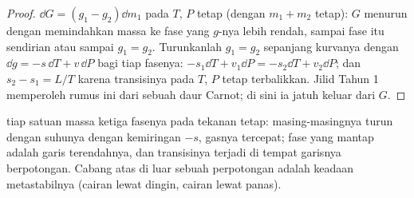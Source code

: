 \begin{proof}
$\dd G = (g_1 - g_2)\dd m_1$ pada $T$, $P$ tetap (dengan $m_1 + m_2$ tetap):
$G$ menurun dengan memindahkan massa ke fase yang $g$-nya lebih rendah, sampai fase
itu sendirian atau sampai $g_1 = g_2$. Turunkanlah $g_1 = g_2$ sepanjang
kurvanya dengan $\dd g = -s\,\dd T + v\,\dd P$ bagi tiap fasenya: $-s_1\dd T +
v_1\dd P = -s_2\dd T + v_2\dd P$; dan $s_2 - s_1 = L/T$ karena transisinya
pada $T$, $P$ tetap terbalikkan. Jilid Tahun 1 memperoleh rumus ini
dari sebuah daur Carnot; di sini ia jatuh keluar dari $G$.
\end{proof}

\begin{omfigure}

{\small {} tiap satuan massa ketiga fasenya pada tekanan
tetap: masing-masingnya turun dengan suhunya dengan kemiringan $-s$, gasnya
tercepat; fase yang mantap adalah garis terendahnya, dan transisinya terjadi
di tempat garisnya berpotongan. Cabang atas di luar sebuah perpotongan adalah
keadaan metastabilnya (cairan lewat dingin, cairan lewat panas).}
\end{omfigure}

